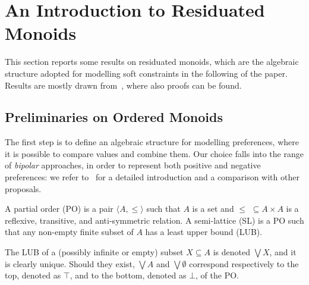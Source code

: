 \documentclass{llncs}
\newcommand{\comment}[1]{}
\begin{document}
\section{An Introduction to Residuated Monoids}\label{sec:bg}

This section reports some results on residuated monoids,
which are the algebraic structure adopted for modelling
soft constraints in the following of the paper.
Results are mostly drawn from~\cite{jlamp17}, where also proofs can be found.


\subsection{Preliminaries on Ordered Monoids}\label{sec:lem}

The first step is to define an algebraic structure for modelling preferences,
where it is possible to compare values and combine them.
Our choice falls into the range of \emph{bipolar} approaches, in order 
to represent both positive and negative preferences: 
we refer to~\cite{ipl17} for a detailed introduction and 
a comparison with other proposals.

\begin{definition}[Orders]
	A partial order (PO) is a pair $\langle A, \leq \rangle$ such that
	$A$ is a set %
	and $\leq \,\,\subseteq A \times A$ is a reflexive, transitive, and
	anti-symmetric  relation.
	A semi-lattice (SL) is a PO
	such that any non-empty finite subset of $A$ has a least upper bound (LUB).
\end{definition}

The LUB of a (possibly infinite or empty) subset $X \subseteq A$ is denoted $\bigvee X$, and it is clearly unique.
Should  they exist, $\bigvee A$ and $\bigvee \emptyset$ correspond respectively to the top, denoted as 
$\top$, and to the bottom, denoted as $\bot$, of the PO.

\comment{\begin{definition}[Compact elements]
An element $a \in A$ is compact 
if whenever $a \leq \bigvee Y$ for some $Y \subseteq A$
there exists a finite subset
$X \subseteq Y$ such that $a \leq \bigvee X$.
%
\end{definition}

We let $A^C \subseteq A$ denote the set of compact elements of ${\mathbb C}$. }
\end{document}
